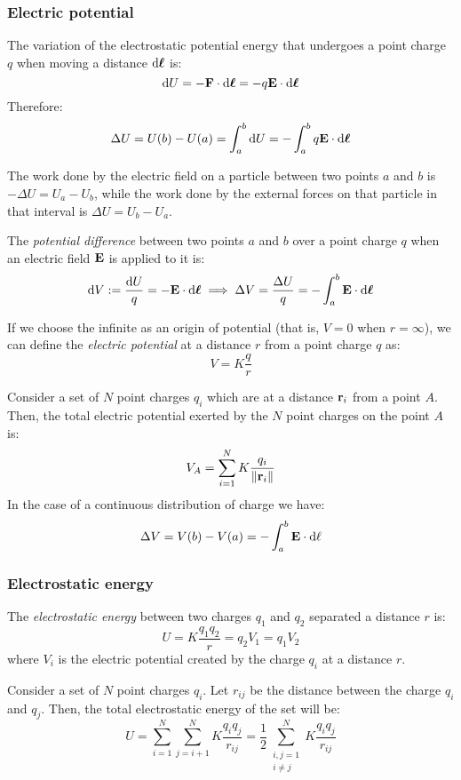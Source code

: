 \documentclass[../../../main_physics.tex]{subfiles}
\begin{document}
\begin{multicols}{2}
  \subsubsection{Electric potential}
  \begin{proposition}
    The variation of the electrostatic potential energy that undergoes a point charge $q$ when moving a distance $\dd{\boldsymbol{\mathrm{\ell}}}$ is:
    $$\dd{U}=-\boldsymbol{\mathrm{F}}\cdot \dd{\boldsymbol{\mathrm{\ell}}}=-q\boldsymbol{\mathrm{E}}\cdot \dd{\boldsymbol{\mathrm{\ell}}}$$
    Therefore:
    $$\Delta U=U(b)-U(a)=\int_a^b\dd{U}=-\int_a^bq\boldsymbol{\mathrm{E}}\cdot \dd{\boldsymbol{\mathrm{\ell}}}$$
  \end{proposition}
  \begin{proposition}
    The work done by the electric field on a particle between two points $a$ and $b$ is $-\Delta U=U_a-U_b$, while the work done by the external forces on that particle in that interval is $\Delta U=U_b-U_a$.
  \end{proposition}
  \begin{definition}
    The \emph{potential difference} between two points $a$ and $b$ over a point charge $q$ when an electric field $\boldsymbol{\mathrm{E}}$ is applied to it is:
    $$\dd{V}:=\frac{\dd{U}}{q}=-\boldsymbol{\mathrm{E}}\cdot\dd{\boldsymbol{\mathrm{\ell}}}\implies\Delta V=\frac{\Delta U}{q}=-\int_a^b\boldsymbol{\mathrm{E}}\cdot\dd{\boldsymbol{\mathrm{\ell}}}$$
  \end{definition}
  \begin{definition}
    If we choose the infinite as an origin of potential (that is, $V=0$ when $r=\infty$), we can define the \emph{electric potential} at a distance $r$ from a point charge $q$ as: $$V=K\frac{q}{r}$$
  \end{definition}
  \begin{principle}
    Consider a set of $N$ point charges $q_i$ which are at a distance $\boldsymbol{\mathrm{r}}_i$ from a point $A$. Then, the total electric potential exerted by the $N$ point charges on the point $A$ is:
    $$V_A=\sum_{i=1}^NK\frac{q_i}{\|\boldsymbol{\mathrm{r}}_{i}\|}$$
    In the case of a continuous distribution of charge we have:
    $$\Delta V=V(b)-V(a)=-\int_a^b\boldsymbol{\mathrm{E}}\cdot\dd\ell$$
  \end{principle}
  \subsubsection{Electrostatic energy}
  \begin{definition}
    The \emph{electrostatic energy} between two charges $q_1$ and $q_2$ separated a distance $r$ is: $$U=K\frac{q_1q_2}{r}=q_2V_1=q_1V_2$$
    where $V_i$ is the electric potential created by the charge $q_i$ at a distance $r$.
  \end{definition}
  \begin{proposition}
    Consider a set of $N$ point charges $q_i$. Let $r_{ij}$ be the distance between the charge $q_i$ and $q_j$. Then, the total electrostatic energy of the set will be: $$U=\sum_{i=1}^N\sum_{j=i+1}^NK\frac{q_iq_j}{r_{ij}}=\frac{1}{2}\sum_{\substack{i,j=1\\i\ne j}}^NK\frac{q_iq_j}{r_{ij}}$$
  \end{proposition}

\end{multicols}
\end{document}
